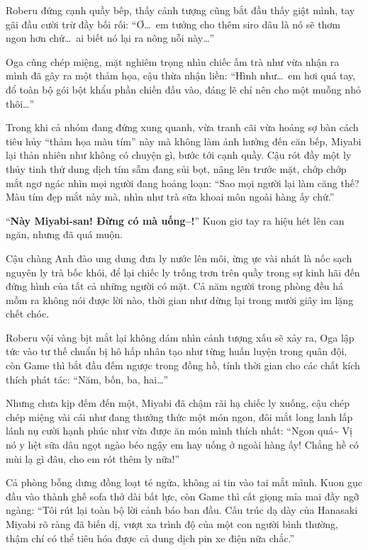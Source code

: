 \documentclass[../main.tex]{subfiles}
\begin{document}
Roberu đứng cạnh quầy bếp, thấy cảnh tượng cũng bắt đầu thấy giật mình, tay gãi đầu cười trừ đầy bối rối: ``Ơ\dots\ em tưởng cho thêm siro dâu là nó sẽ thơm ngon hơn chứ\dots\ ai biết nó lại ra nông nỗi này\dots''

Oga cũng chép miệng, mặt nghiêm trọng nhìn chiếc ấm trà như vừa nhận ra mình đã gây ra một thảm họa, cậu thừa nhận liền: ``Hình như\dots\ em hơi quá tay, đổ toàn bộ gói bột khẩu phần chiến đấu vào, đáng lẽ chỉ nên cho một muỗng nhỏ thôi\dots''

Trong khi cả nhóm đang đứng xung quanh, vừa tranh cãi vừa hoảng sợ bàn cách tiêu hủy ``thảm họa màu tím'' này mà không làm ảnh hưởng đến căn bếp, Miyabi lại thản nhiên như không có chuyện gì, bước tới cạnh quầy. Cậu rót đầy một ly thủy tinh thứ dung dịch tím sẫm đang sủi bọt, nâng lên trước mặt, chớp chớp mắt ngơ ngác nhìn mọi người đang hoảng loạn: ``Sao mọi người lại làm căng thế? Màu tím đẹp mắt này mà, nhìn như trà sữa khoai môn ngoài hàng ấy chứ.''

``\textbf{Này Miyabi-san! Đừng có mà uống--!}'' Kuon giơ tay ra hiệu hét lên can ngăn, nhưng đã quá muộn.

Cậu chàng Anh đào ung dung đưa ly nước lên môi, ừng ực vài nhát là nốc sạch nguyên ly trà bốc khói, để lại chiếc ly trống trơn trên quầy trong sự kinh hãi đến đứng hình của tất cả những người có mặt. Cả năm người trong phòng đều há mồm ra không nói được lời nào, thời gian như dừng lại trong mười giây im lặng chết chóc.

Roberu vội vàng bịt mắt lại không dám nhìn cảnh tượng xấu sẽ xảy ra, Oga lập tức vào tư thế chuẩn bị hô hấp nhân tạo như từng huấn luyện trong quân đội, còn Game thì bắt đầu đếm ngược trong đồng hồ, tính thời gian cho các chất kích thích phát tác: ``Năm, bốn, ba, hai\dots''

Nhưng chưa kịp đếm đến một, Miyabi đã chậm rãi hạ chiếc ly xuống, cậu chép chép miệng vài cái như đang thưởng thức một món ngon, đôi mắt long lanh lấp lánh nụ cười hạnh phúc như vừa được ăn món mình thích nhất: ``Ngon quá\~{} Vị nó y hệt sữa dâu ngọt ngào béo ngậy em hay uống ở ngoài hàng ấy! Chẳng hề có mùi lạ gì đâu, cho em rót thêm ly nữa!''

Cả phòng bỗng dưng đồng loạt té ngửa, không ai tin vào tai mắt mình. Kuon gục đầu vào thành ghế sofa thở dài bất lực, còn Game thì cất giọng mỉa mai đầy ngỡ ngàng: ``Tôi rút lại toàn bộ lời cảnh báo ban đầu. Cấu trúc dạ dày của Hanasaki Miyabi rõ ràng đã biến dị, vượt xa trình độ của một con người bình thường, thậm chí có thể tiêu hóa được cả dung dịch pin xe điện nữa chắc.''
\end{document}
